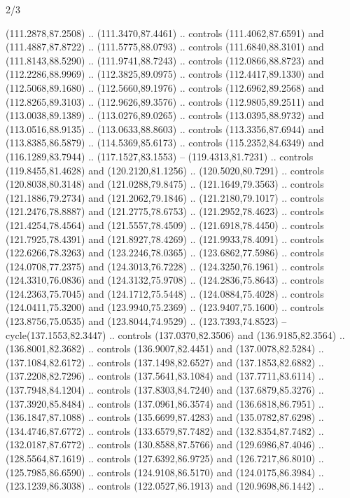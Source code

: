 \begin{flagdescription}{2/3}
\begin{scope}[shift={(0.5\flaglength,0.5)},scale=\flagwidth/320]
\begin{scope}[y=0.8pt, x=0.8pt, yscale=-1,shift={(-118.3,-146)}]
  (111.2878,87.2508) .. (111.3470,87.4461) .. controls (111.4062,87.6591) and
  (111.4887,87.8722) .. (111.5775,88.0793) .. controls (111.6840,88.3101) and
  (111.8143,88.5290) .. (111.9741,88.7243) .. controls (112.0866,88.8723) and
  (112.2286,88.9969) .. (112.3825,89.0975) .. controls (112.4417,89.1330) and
  (112.5068,89.1680) .. (112.5660,89.1976) .. controls (112.6962,89.2568) and
  (112.8265,89.3103) .. (112.9626,89.3576) .. controls (112.9805,89.2511) and
  (113.0038,89.1389) .. (113.0276,89.0265) .. controls (113.0395,88.9732) and
  (113.0516,88.9135) .. (113.0633,88.8603) .. controls (113.3356,87.6944) and
  (113.8385,86.5879) .. (114.5369,85.6173) .. controls (115.2352,84.6349) and
  (116.1289,83.7944) .. (117.1527,83.1553) -- (119.4313,81.7231) .. controls
  (119.8455,81.4628) and (120.2120,81.1256) .. (120.5020,80.7291) .. controls
  (120.8038,80.3148) and (121.0288,79.8475) .. (121.1649,79.3563) .. controls
  (121.1886,79.2734) and (121.2062,79.1846) .. (121.2180,79.1017) .. controls
  (121.2476,78.8887) and (121.2775,78.6753) .. (121.2952,78.4623) .. controls
  (121.4254,78.4564) and (121.5557,78.4509) .. (121.6918,78.4450) .. controls
  (121.7925,78.4391) and (121.8927,78.4269) .. (121.9933,78.4091) .. controls
  (122.6266,78.3263) and (123.2246,78.0365) .. (123.6862,77.5986) .. controls
  (124.0708,77.2375) and (124.3013,76.7228) .. (124.3250,76.1961) .. controls
  (124.3310,76.0836) and (124.3132,75.9708) .. (124.2836,75.8643) .. controls
  (124.2363,75.7045) and (124.1712,75.5448) .. (124.0884,75.4028) .. controls
  (124.0411,75.3200) and (123.9940,75.2369) .. (123.9407,75.1600) .. controls
  (123.8756,75.0535) and (123.8044,74.9529) .. (123.7393,74.8523) --
  cycle(137.1553,82.3447) .. controls (137.0370,82.3506) and (136.9185,82.3564)
  .. (136.8001,82.3682) .. controls (136.9007,82.4451) and (137.0078,82.5284) ..
  (137.1084,82.6172) .. controls (137.1498,82.6527) and (137.1853,82.6882) ..
  (137.2208,82.7296) .. controls (137.5641,83.1084) and (137.7711,83.6114) ..
  (137.7948,84.1204) .. controls (137.8303,84.7240) and (137.6879,85.3276) ..
  (137.3920,85.8484) .. controls (137.0961,86.3574) and (136.6818,86.7951) ..
  (136.1847,87.1088) .. controls (135.6699,87.4283) and (135.0782,87.6298) ..
  (134.4746,87.6772) .. controls (133.6579,87.7482) and (132.8354,87.7482) ..
  (132.0187,87.6772) .. controls (130.8588,87.5766) and (129.6986,87.4046) ..
  (128.5564,87.1619) .. controls (127.6392,86.9725) and (126.7217,86.8010) ..
  (125.7985,86.6590) .. controls (124.9108,86.5170) and (124.0175,86.3984) ..
  (123.1239,86.3038) .. controls (122.0527,86.1913) and (120.9698,86.1442) ..

\end{scope}
\end{scope}
\end{flagdescription}
